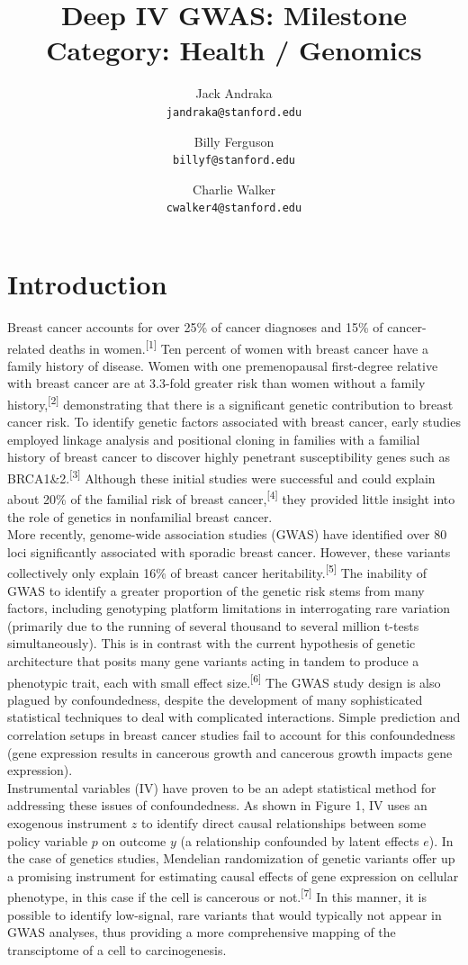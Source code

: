 \documentclass[11pt, oneside, twocolumn]{article}   	%
\title{Deep IV GWAS: Milestone \\
	\large Category: Health / Genomics}
\author{
	Jack Andraka\\ 
	\texttt{jandraka@stanford.edu}
	\and
	Billy Ferguson\\
	\texttt{billyf@stanford.edu}
	\and
	Charlie Walker\\
	\texttt{cwalker4@stanford.edu}
}
\date{}							%
\begin{document}
\maketitle
\section{Introduction}
Breast cancer accounts for over 25\% of cancer diagnoses and 15\% of cancer-related deaths in women.\textsuperscript{[1]} Ten percent of women with breast cancer have a family history of disease. Women with one premenopausal first-degree relative with breast cancer are at 3.3-fold greater risk than women without a family history,\textsuperscript{[2]} demonstrating that there is a significant genetic contribution to breast cancer risk. To identify genetic factors associated with breast cancer, early studies employed linkage analysis and positional cloning in families with a familial history of breast cancer to discover highly penetrant susceptibility genes such as BRCA1\&2.\textsuperscript{[3]} Although these initial studies were successful and could explain about 20\% of the familial risk of breast cancer,\textsuperscript{[4]} they provided little insight into the role of genetics in nonfamilial breast cancer. \\

More recently, genome-wide association studies (GWAS) have identified over 80 loci significantly associated with sporadic breast cancer. However, these variants collectively only explain 16\% of breast cancer heritability.\textsuperscript{[5]} The inability of GWAS to identify a greater proportion of the genetic risk stems from many factors, including genotyping platform limitations in interrogating rare variation (primarily due to the running of several thousand to several million t-tests simultaneously). This is in contrast with the current hypothesis of genetic architecture that posits many gene variants acting in tandem to produce a phenotypic trait, each with small effect size.\textsuperscript{[6]} The GWAS study design is also plagued by confoundedness, despite the development of many sophisticated statistical techniques to deal with complicated interactions. Simple prediction and correlation setups in breast cancer studies fail to account for this confoundedness (gene expression results in cancerous growth and cancerous growth impacts gene expression). \\

Instrumental variables (IV) have proven to be an adept statistical method for addressing these issues of confoundedness. As shown in Figure 1, IV uses an exogenous instrument $z$ to identify direct causal relationships between some policy variable $p$ on outcome $y$ (a relationship confounded by latent effects $e$). In the case of genetics studies, Mendelian randomization of genetic variants offer up a promising instrument for estimating causal effects of gene expression on cellular phenotype, in this case if the cell is cancerous or not.\textsuperscript{[7]} In this manner, it is possible to identify low-signal, rare variants that would typically not appear in GWAS analyses, thus providing a more comprehensive mapping of the transciptome of a cell to carcinogenesis. \\
\end{document}
